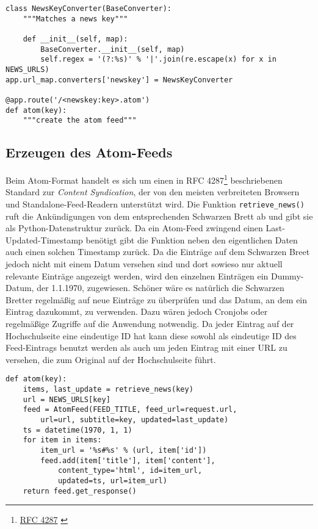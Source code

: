 \begin{lstlisting}[caption=HSKAtom - Routing,label=lst:hskatom-route-atom]
class NewsKeyConverter(BaseConverter):
    """Matches a news key"""

    def __init__(self, map):
        BaseConverter.__init__(self, map)
        self.regex = '(?:%s)' % '|'.join(re.escape(x) for x in NEWS_URLS)
app.url_map.converters['newskey'] = NewsKeyConverter

@app.route('/<newskey:key>.atom')
def atom(key):
    """create the atom feed"""
\end{lstlisting}

\subsection{Erzeugen des Atom-Feeds}

Beim Atom-Format handelt es sich um einen in RFC 4287\footnote{\href{http://www.ietf.org/rfc/rfc4287}{RFC
4287} \citep{rfc4287}} beschriebenen Standard zur \emph{Content Syndication}, der von den meisten verbreiteten
Browsern und Standalone-Feed-Readern unterstützt wird. Die Funktion \lstinline{retrieve_news()} ruft
die Ankündigungen von dem entsprechenden Schwarzen Brett ab und gibt sie als Python-Datenstruktur
zurück. Da ein Atom-Feed zwingend einen Last-Updated-Timestamp benötigt gibt die Funktion neben den
eigentlichen Daten auch einen solchen Timestamp zurück. Da die Einträge auf dem Schwarzen Breet
jedoch nicht mit einem Datum versehen sind und dort sowieso nur aktuell relevante Einträge angezeigt
werden, wird den einzelnen Einträgen ein Dummy-Datum, der 1.1.1970, zugewiesen. Schöner wäre es
natürlich die Schwarzen Bretter regelmäßig auf neue Einträge zu überprüfen und das Datum, an dem ein
Eintrag dazukommt, zu verwenden. Dazu wären jedoch Cronjobs oder regelmäßige Zugriffe auf die
Anwendung notwendig. Da jeder Eintrag auf der Hochschulseite eine eindeutige ID hat kann diese
sowohl als eindeutige ID des Feed-Eintrags benutzt werden als auch um jeden Eintrag mit einer URL zu
versehen, die zum Original auf der Hochschulseite führt.

\begin{lstlisting}[caption=HSKAtom - Atom-Feed,label=lst:hskatom-atom]
def atom(key):
    items, last_update = retrieve_news(key)
    url = NEWS_URLS[key]
    feed = AtomFeed(FEED_TITLE, feed_url=request.url,
        url=url, subtitle=key, updated=last_update)
    ts = datetime(1970, 1, 1)
    for item in items:
        item_url = '%s#%s' % (url, item['id'])
        feed.add(item['title'], item['content'],
            content_type='html', id=item_url,
            updated=ts, url=item_url)
    return feed.get_response()
\end{lstlisting}

